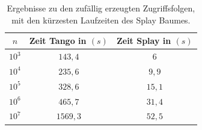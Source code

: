 \documentclass[a4paper,12pt]{article}
\begin{document}
\begin{table}[H]
	\begin{center}
		\begin{tabular}[c]{|c|c|c|}
			\hline
			$n$ & Zeit Tango in $\left(s\right)$ &Zeit Splay in $\left(s\right)$ \\
			\hline
			$10^3$ & $143,4$ &$6$ \\
			\hline
			$10^4$  & $235,6$ &$9,9$  \\
			\hline
			$10^5$  & $328,6$ &$15,1$  \\
			\hline
			$10^6$  & $465,7$ &$31,4$  \\
			\hline
			$10^7$  & $1569,3$ &$52,5$  \\
			\hline
		\end{tabular}
		\caption{Ergebnisse zu den zufällig erzeugten Zugriffsfolgen, mit den kürzesten Laufzeiten des Splay Baumes.} 
	\end{center}
\end{table}
\end{document}
